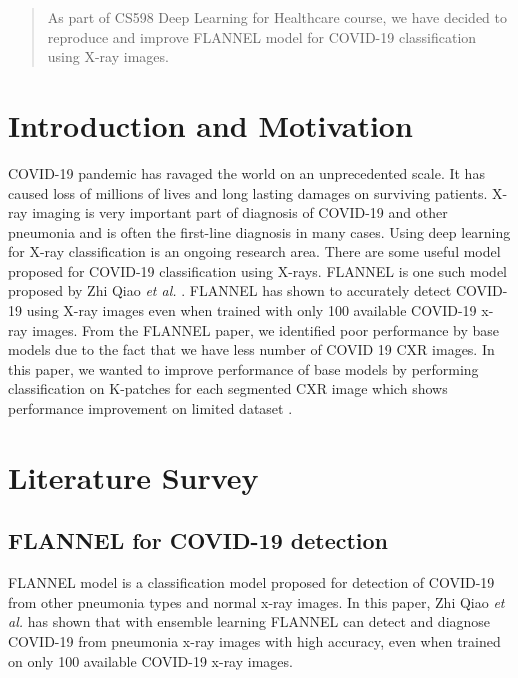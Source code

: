 \documentclass{sigkddExp}
\begin{document}
\date{28 March 2021}
\maketitle
\begin{abstract}
    As part of CS598 Deep Learning for Healthcare course, we have decided to
    reproduce and improve FLANNEL model\cite{10.1093/jamia/ocaa280} for COVID-19
    classification using X-ray images.
\end{abstract}

\section{Introduction and Motivation}
COVID-19 pandemic has ravaged the world on an unprecedented scale. It has caused
loss of millions of lives and long lasting damages on surviving patients. X-ray
imaging is very important part of diagnosis of COVID-19 and other pneumonia and
is often the first-line diagnosis in many cases. Using deep learning for X-ray
classification is an ongoing research area. There are some useful model proposed
for COVID-19 classification using X-rays. FLANNEL is one such model proposed by
Zhi Qiao \textit{et al.} \cite{10.1093/jamia/ocaa280}. FLANNEL has shown to
accurately detect COVID-19 using X-ray images even when trained with only 100
available COVID-19 x-ray images. From the FLANNEL paper, we identified poor
performance by base models due to the fact that we have less number of COVID 19
CXR images. In this paper, we wanted to improve performance of base models by
performing classification on K-patches for each segmented CXR image which shows
performance improvement on limited dataset \cite{pmid32396075}.


\section{Literature Survey}

\subsection{FLANNEL for COVID-19 detection}

FLANNEL model \cite{10.1093/jamia/ocaa280} is a classification model proposed
for detection of COVID-19 from other pneumonia types and normal x-ray images. In
this paper, Zhi Qiao \textit{et al.} has shown that with ensemble learning
FLANNEL can detect and diagnose COVID-19 from pneumonia x-ray images with high
accuracy, even when trained on only 100 available COVID-19 x-ray images.
\end{document}
